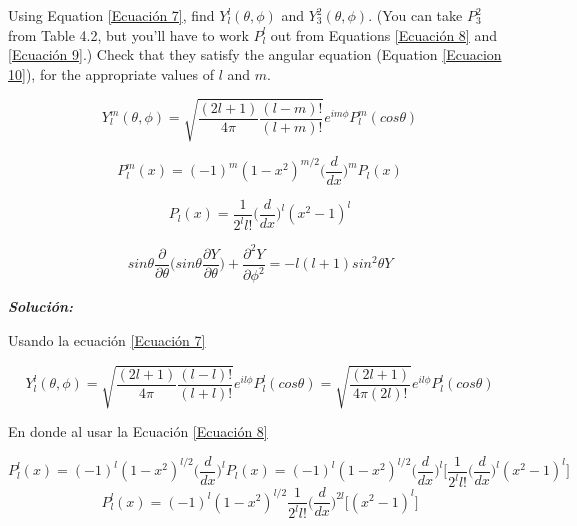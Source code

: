 \documentclass[10pt]{article}
\begin{document}
\medskip
\begin{tcolorbox}[colback=gray!10, colframe=black, title=Problem 7]

 Using Equation \ref{Ecuación 7}, find $Y_{l}^{l}(\theta,\phi)$ and $Y_{3}^{2}(\theta,\phi)$. (You can take $P_{3}^{2}$
from Table 4.2, but you’ll have to work $P_{l}^{l}$ out from Equations \ref{Ecuación 8} and \ref{Ecuación 9}.)
Check that they satisfy the angular equation (Equation \ref{Ecuacion 10}), for the appropriate
values of $l$ and $m$.

\begin{equation}
    Y_{l}^{m}(\theta,\phi)=\sqrt{\frac{(2l+1)}{4\pi}\frac{(l-m)!}{(l+m)!}}e^{im\phi}P_{l}^{m}(cos\theta)
    \label{Ecuación 7}
\end{equation}

\begin{equation}
    P_{l}^{m}(x)=(-1)^{m}(1-x^{2})^{m/2}\bigg(\frac{d}{dx}\bigg)^{m}P_{l}(x)
    \label{Ecuación 8}
\end{equation}

\begin{equation}
    P_{l}(x)=\frac{1}{2^{l}l!}\bigg(\frac{d}{dx} \bigg)^{l}(x^{2}-1)^{l}
    \label{Ecuación 9}
\end{equation}

\begin{equation}
    sin\theta\frac{\partial}{\partial \theta}\bigg( sin\theta \frac{\partial Y}{\partial \theta} \bigg) + \frac{\partial^{2} Y}{\partial\phi^{2}}= -l(l+1)sin^{2}\theta Y
    \label{Ecuacion 10}
\end{equation}

\end{tcolorbox}
\medskip


\Large{\textit{\textbf{Solución:}}}

\medskip

Usando la ecuación \ref{Ecuación 7}

$$Y_{l}^{l}(\theta,\phi)=\sqrt{\frac{(2l+1)}{4\pi}\frac{(l-l)!}{(l+l)!}}e^{il\phi}P_{l}^{l}(cos\theta)=\sqrt{\frac{(2l+1)}{4\pi(2l)!}}e^{il\phi}P_{l}^{l}(cos\theta)$$

En donde al usar la Ecuación \ref{Ecuación 8}

$$P_{l}^{l}(x)=(-1)^{l}(1-x^{2})^{l/2}\bigg(\frac{d}{dx} \bigg)^{l}P_{l}(x)=(-1)^{l}(1-x^{2})^{l/2}\bigg(\frac{d}{dx} \bigg)^{l}\bigg[\frac{1}{2^{l}l!}\bigg(\frac{d}{dx} \bigg)^{l}(x^{2}-1)^{l}\bigg]$$
$$P_{l}^{l}(x)=(-1)^{l}(1-x^{2})^{l/2}\frac{1}{2^{l}l!}\bigg(\frac{d}{dx} \bigg)^{2l}\bigg[ (x^{2}-1)^{l} \bigg]$$
\end{document}

